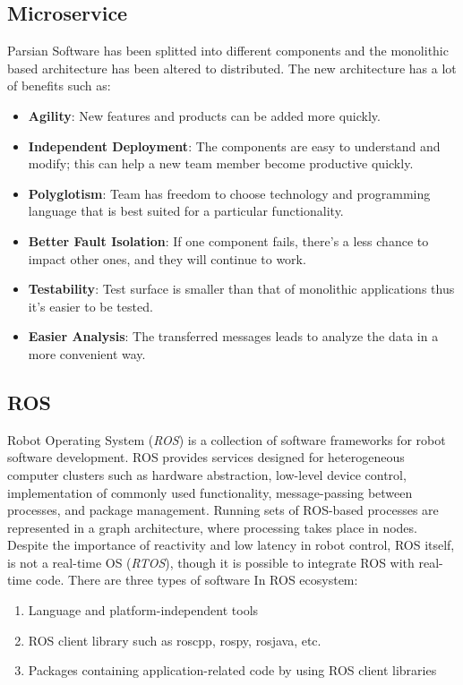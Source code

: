 \documentclass{llncs}
\begin{document}
\subsection{Microservice}
\label{subsec:Microservice}
Parsian Software has been splitted into different components and the monolithic based architecture has been altered to distributed. The new architecture has a lot of  benefits such as:
\begin{itemize}
  \item \textbf{Agility}: New features and products can be added more quickly.
  \item \textbf{Independent Deployment}: The components are easy to understand and modify; this can help a new team member become productive quickly.
	\item \textbf{Polyglotism}: Team has freedom to choose technology and programming language that is best suited for a particular functionality.
	\item \textbf{Better Fault Isolation}: If one component fails, there's a less chance to impact other ones, and they will continue to work.
	\item \textbf{Testability}: Test surface is smaller than that of monolithic applications thus it’s easier to be tested.
	\item \textbf{Easier Analysis}: The transferred messages leads to analyze the data in a more convenient way.
\end{itemize}

\subsection{ROS}
\label{subsec:ROS}
Robot Operating System (\textit{ROS}) is a collection of software frameworks for robot software development. ROS provides services designed for heterogeneous computer clusters such as hardware abstraction, low-level device control, implementation of commonly used functionality, message-passing between processes, and package management. Running sets of ROS-based processes are represented in a graph architecture, where processing takes place in nodes. Despite the importance of reactivity and low latency in robot control, ROS itself, is not a real-time OS (\textit{RTOS}), though it is possible to integrate ROS with real-time code.
There are three types of software In ROS ecosystem:
\begin{enumerate} 
	\item Language and platform-independent tools
	\item ROS client library such as roscpp, rospy, rosjava, etc.
	\item Packages containing application-related code by using ROS client libraries
\end{enumerate}
\end{document}
